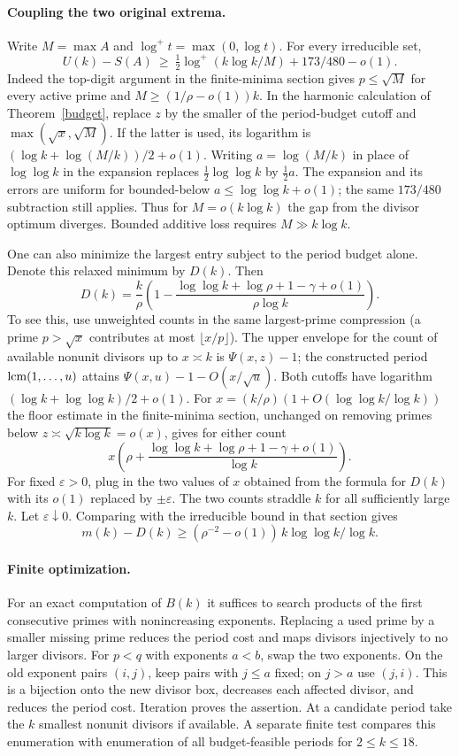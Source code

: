 \documentclass[10pt]{article}
\newcommand{\lcm}{\mathop{\rm lcm}}
\begin{document}
\paragraph{Coupling the two original extrema.}
Write $M=\max A$ and $\log^+t=\max(0,\log t)$. For every irreducible set,
\[
 U(k)-S(A)\ \ge\ \tfrac12\log^+(k\log k/M)+173/480-o(1).
\]
Indeed the top-digit argument in the finite-minima section gives $p\le\sqrt M$ for every active prime and $M\ge(1/\rho-o(1))k$. In the harmonic calculation of Theorem~\ref{budget}, replace $z$ by the smaller of the period-budget cutoff and $\max(\sqrt{x},\sqrt M)$. If the latter is used, its logarithm is $(\log k+\log(M/k))/2+o(1)$. Writing $a=\log(M/k)$ in place of $\log\log k$ in the expansion replaces $\frac12\log\log k$ by $\frac12 a$. The expansion and its errors are uniform for bounded-below $a\le\log\log k+o(1)$; the same $173/480$ subtraction still applies. Thus for $M=o(k\log k)$ the gap from the divisor optimum diverges. Bounded additive loss requires $M\gg k\log k$.

One can also minimize the largest entry subject to the period budget alone. Denote this relaxed minimum by $D(k)$. Then
\[
D(k)=\frac{k}{\rho}\left(1-\frac{\log\log k+\log\rho+1-\gamma+o(1)}{\rho\log k}\right).
\]
To see this, use unweighted counts in the same largest-prime compression (a prime $p>\sqrt{x}$ contributes at most $\lfloor x/p\rfloor$). The upper envelope for the count of available nonunit divisors up to $x\asymp k$ is $\Psi(x,z)-1$; the constructed period $\lcm(1,\ldots,u)$ attains $\Psi(x,u)-1-O(x/\sqrt{u})$. Both cutoffs have logarithm $(\log k+\log\log k)/2+o(1)$. For $x=(k/\rho)(1+O(\log\log k/\log k))$ the floor estimate in the finite-minima section, unchanged on removing primes below $z\asymp\sqrt{k\log k}=o(x)$, gives for either count
\[
 x\left(\rho+\frac{\log\log k+\log\rho+1-\gamma+o(1)}{\log k}\right).
\]
For fixed $\varepsilon>0$, plug in the two values of $x$ obtained from the formula for $D(k)$ with its $o(1)$ replaced by $\pm\varepsilon$. The two counts straddle $k$ for all sufficiently large $k$. Let $\varepsilon\downarrow0$. Comparing with the irreducible bound in that section gives
\[
 m(k)-D(k)\ge (\rho^{-2}-o(1))\,k\log\log k/\log k.
\]
\paragraph{Finite optimization.}
For an exact computation of $B(k)$ it suffices to search products of the first consecutive primes with nonincreasing exponents. Replacing a used prime by a smaller missing prime reduces the period cost and maps divisors injectively to no larger divisors. For $p<q$ with exponents $a<b$, swap the two exponents. On the old exponent pairs $(i,j)$, keep pairs with $j\le a$ fixed; on $j>a$ use $(j,i)$. This is a bijection onto the new divisor box, decreases each affected divisor, and reduces the period cost. Iteration proves the assertion. At a candidate period take the $k$ smallest nonunit divisors if available. A separate finite test compares this enumeration with enumeration of all budget-feasible periods for $2\le k\le18$.
\end{document}
